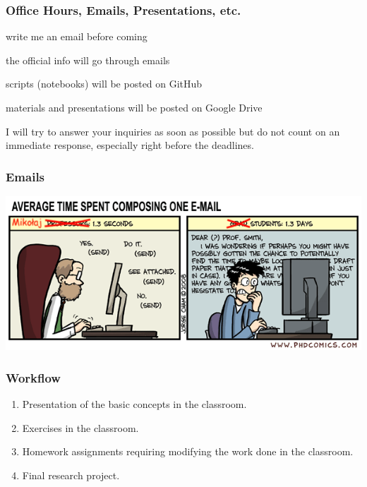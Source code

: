 \documentclass{beamer}
\begin{document}
\begin{frame}
    \frametitle{Office Hours, Emails, Presentations, etc.}
    \begin{description}
        \item [Office Hours:] write me an email before coming
        \item [Emails:] the official info will go through emails
        \item [GitHub:] scripts (notebooks) will be posted on GitHub
        \item [Google Classroom:] materials and presentations will be posted on
        Google Drive
    \end{description}
    \alert{I will try to answer your inquiries as soon as possible but do not
    count on an immediate response, especially right before the deadlines.}
\end{frame}
\begin{frame}
    \frametitle{Emails}
    \includegraphics[width = \textwidth]{emails.png}
\end{frame}
\begin{frame}
    \frametitle{Workflow}
    \begin{enumerate}
        \item Presentation of the basic concepts in the classroom.
        \item Exercises in the classroom.
        \item Homework assignments requiring modifying the work done in the
        classroom.
        \item Final research project.
    \end{enumerate}
\end{frame}
\end{document}
